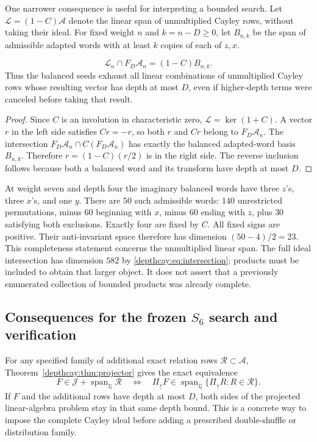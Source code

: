 One narrower consequence is useful for interpreting a bounded search.
Let $\mathcal L=(1-C)\mathcal A$ denote the linear span of unmultiplied
Cayley rows, without taking their ideal. For fixed weight $n$ and
$k=n-D\ge0$, let $B_{n,k}$ be the span of admissible adapted words
with at least $k$ copies of each of $z,x$.

\begin{proposition}\label{depthcay:prop:balanced}
\[
 \mathcal L_n\cap F_D\mathcal A_n=(1-C)B_{n,k}.
\]
Thus the balanced seeds exhaust all linear combinations of unmultiplied
Cayley rows whose resulting vector has depth at most $D$, even if
higher-depth terms were canceled before taking that result.
\end{proposition}
\begin{proof}
Since $C$ is an involution in characteristic zero,
$\mathcal L=\ker(1+C)$. A vector $r$ in the left side satisfies
$Cr=-r$, so both $r$ and $Cr$ belong to $F_D\mathcal A_n$.
The intersection $F_D\mathcal A_n\cap C(F_D\mathcal A_n)$ has
exactly the balanced adapted-word basis $B_{n,k}$. Therefore
$r=(1-C)(r/2)$ is in the right side. The reverse inclusion follows
because both a balanced word and its transform have depth at most $D$.
\end{proof}

At weight seven and depth four the imaginary balanced words have three
$z$'s, three $x$'s, and one $y$. There are $50$ such admissible words:
$140$ unrestricted permutations, minus $60$ beginning with $x$, minus
$60$ ending with $z$, plus $30$ satisfying both exclusions. Exactly
four are fixed by $C$. All fixed signs are positive. Their anti-invariant
space therefore has dimension $(50-4)/2=23$.
This completeness statement concerns the unmultiplied linear span.
The full ideal intersection has dimension $582$ by
\eqref{depthcay:eq:intersection}; products must be included to obtain
that larger object. It does not assert that a previously enumerated
collection of bounded products was already complete.

\subsection{Consequences for the frozen \texorpdfstring{$S_6$}{S6} search and verification}

For any specified family of additional exact relation rows
$\mathscr R\subset\mathcal A$, Theorem~\ref{depthcay:thm:projector}
gives the exact equivalence
\begin{equation}\label{depthcay:eq:combined}
 F\in\mathcal J+\operatorname{span}_{\mathbb Q}\mathscr R
 \quad\Longleftrightarrow\quad
 \Pi_{\uparrow}F\in
 \operatorname{span}_{\mathbb Q}\{\Pi_{\uparrow}R:R\in\mathscr R\}.
\end{equation}
If $F$ and the additional rows have depth at most $D$, both sides of
the projected linear-algebra problem stay in that same depth bound.
This is a concrete way to impose the complete Cayley ideal before
adding a prescribed double-shuffle or distribution family.

